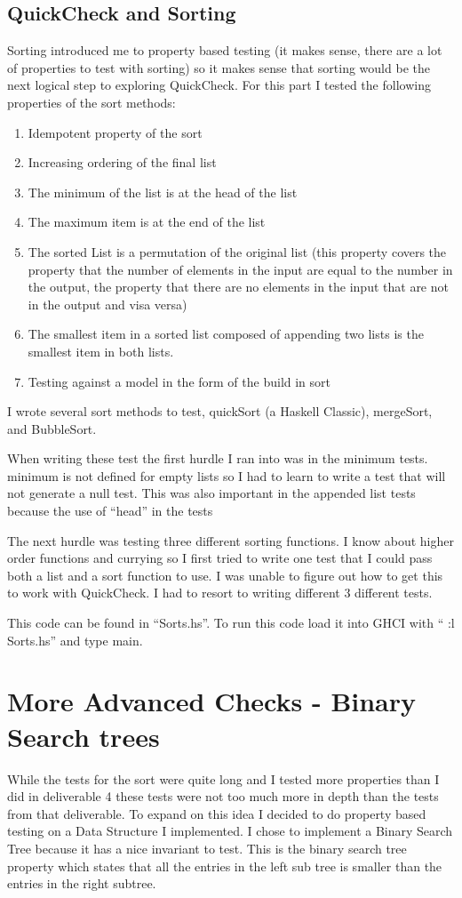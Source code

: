 \documentclass[titlepage]{article}
\begin{document}
\subsection{QuickCheck and Sorting}
Sorting introduced me to property based testing (it makes sense, there are a lot 
of properties to test with sorting) so it makes sense that sorting would be the 
next logical step to exploring QuickCheck. For this part I tested the following 
properties of the sort methods:
\begin{enumerate}
	\item Idempotent property of the sort
	\item Increasing ordering of the final list
	\item The minimum of the list is at the head of the list
	\item The maximum item is at the end of the list
	\item The sorted List is a permutation of the original list (this property 
	covers the property that the number of elements in the input are equal to the 
	number in the output, the property that there are no elements in the input 
	that are not in the output and visa versa)
	\item The smallest item in a sorted list composed of appending two lists is 
	      the smallest item in both lists.
	\item Testing against a model in the form of the build in sort
\end{enumerate}
I wrote several sort methods to test, quickSort (a Haskell Classic), mergeSort, 
and BubbleSort.

When writing these test the first hurdle I ran into was in the minimum tests. 
minimum is not defined for empty lists so I had to learn to write a test that 
will not generate a null test. This was also important in the appended list tests 
because the use of ``head'' in the tests

The next hurdle was testing three different sorting functions. I know about 
higher order functions and currying so I first tried to write one test that I 
could pass both a list and a sort function to use. I was unable to figure out 
how to get this to work with QuickCheck. I had to resort to writing different 3 
different tests.

This code can be found in ``Sorts.hs''. To run this code load it into GHCI with ``
:l Sorts.hs'' and type main.

\section{More Advanced Checks - Binary Search trees}
While the tests for the sort were quite long and I tested more properties than I 
did in deliverable 4 these tests were not too much more in depth than the tests 
from that deliverable. To expand on this idea I decided to do property based 
testing on a Data Structure I implemented. I chose to implement a Binary Search 
Tree because it has a nice invariant to test. This is the binary search tree 
property which states that all the entries in the left sub tree is smaller than 
the entries in the right subtree. 
\end{document}

